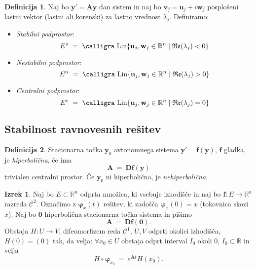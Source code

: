 \documentclass[11pt]{article}
\newcommand{\R}{\mathbb{R}}
\newcommand{\f}{\mathbf{f}}
\newcommand{\y}{\mathbf{y}}
\newcommand{\uu}{\mathbf{u}}
\newcommand{\vv}{\mathbf{v}}
\newcommand{\w}{\mathbf{w}}
\newcommand{\A}{\mathbf{A}}
\newcommand{\C}{\mathcal{C}}
\newcommand{\set}[1]{\{#1\}}
\newcommand{\re}{\mathfrak{Re}}
\newcommand{\Lin}{\text{\calligra Lin}}
\newcommand{\0}{\mathbf{0}}
\theoremstyle{definition}
\newtheorem{definicija}{Definicija}[section]
\theoremstyle{definition}
\theoremstyle{definition}
\newtheorem{izrek}{Izrek}[section]
\theoremstyle{definition}
\begin{document}
\begin{definicija}

Naj bo $\y' = \A\y$ dan sistem in naj bo $\vv_j = \uu_j + i\w_j$ posplošeni lastni vektor (lastni ali korenski) za lastno vrednost $\lambda_j$. Definiramo:
\begin{itemize}

\item \textit{Stabilni podprostor}:
$$E^s ~=~ \Lin\set{\uu_j, \w_j \in \R^n \mid \re(\lambda_j)<0}$$

\item \textit{Nestabilni podprostor}:
$$E^n ~=~ \Lin\set{\uu_j, \w_j \in \R^n \mid \re(\lambda_j)>0}$$

\item \textit{Centralni podprostor}:
$$E^c ~=~ \Lin\set{\uu_j, \w_j \in \R^n \mid \re(\lambda_j)=0}$$

\end{itemize}

\end{definicija}
\vspace{0.5cm}


\subsection{Stabilnost ravnovesnih rešitev}
\vspace{0.5cm}

\begin{definicija}

Stacionarna točka $\y_0$ avtonomnega sistema $\y' = \f(\y)$, $\f$ gladka, je \textit{hiperbolična}, če ima
$$\A ~=~ \mathbf{D}\f(\y)$$
trivialen centralni prostor. Če $\y_0$ ni hiperbolična, je \textit{nehiperbolična}.

\end{definicija}
\vspace{0.5cm}

\begin{izrek}

Naj bo $E \subset \R^n$ odprta množica, ki vsebuje izhodišče in naj bo $\f: E \rightarrow \R^n$ razreda $\C^2$. Označimo z $\bm{\varphi}_x(t)$ rešitev, ki zadošča $\bm{\varphi}_x(0) = x$ (tokovnica skozi $x$). Naj bo $\0$ hiperbolična stacionarna točka sistema in pišimo
$$\A ~=~ \mathbf{D}\f(\0).$$
Obstaja $H: U \rightarrow V$, difeomorfizem reda $\C^1$, $U,V$ odprti okolici izhodišča, $H(0)=(0)$ tak, da velja: $\forall x_0 \in U$ obstaja odprt interval $I_0$ okoli $0$, $I_0 \subset \R$ in velja
$$H \circ \bm{\varphi}_{x_0} ~=~ e^{\A t} H(x_0).$$

\end{izrek}
\vspace{0.5cm}
\end{document}
